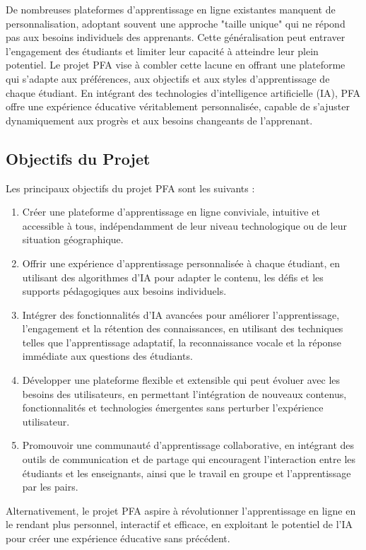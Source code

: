 De nombreuses plateformes d'apprentissage en ligne existantes manquent de personnalisation, adoptant souvent une approche "taille unique" qui ne répond pas aux besoins individuels des apprenants. Cette généralisation peut entraver l'engagement des étudiants et limiter leur capacité à atteindre leur plein potentiel. Le projet \gls{PFA} vise à combler cette lacune en offrant une plateforme qui s'adapte aux préférences, aux objectifs et aux styles d'apprentissage de chaque étudiant. En intégrant des technologies d'intelligence artificielle (\gls{IA}), \gls{PFA} offre une expérience éducative véritablement personnalisée, capable de s'ajuster dynamiquement aux progrès et aux besoins changeants de l'apprenant.

\subsection{Objectifs du Projet}

Les principaux objectifs du projet \gls{PFA} sont les suivants :

\begin{enumerate}[label=\Roman*.]

    \item Créer une plateforme d'apprentissage en ligne conviviale, intuitive et accessible à tous, indépendamment de leur niveau technologique ou de leur situation géographique.
    \item Offrir une expérience d'apprentissage personnalisée à chaque étudiant, en utilisant des algorithmes d'\gls{IA} pour adapter le contenu, les défis et les supports pédagogiques aux besoins individuels.
    \item Intégrer des fonctionnalités d'\gls{IA} avancées pour améliorer l'apprentissage, l'engagement et la rétention des connaissances, en utilisant des techniques telles que l'apprentissage adaptatif, la reconnaissance vocale et la réponse immédiate aux questions des étudiants.
    \item Développer une plateforme flexible et extensible qui peut évoluer avec les besoins des utilisateurs, en permettant l'intégration de nouveaux contenus, fonctionnalités et technologies émergentes sans perturber l'expérience utilisateur.
    \item Promouvoir une communauté d'apprentissage collaborative, en intégrant des outils de communication et de partage qui encouragent l'interaction entre les étudiants et les enseignants, ainsi que le travail en groupe et l'apprentissage par les pairs.

\end{enumerate}
Alternativement, le projet \gls{PFA} aspire à révolutionner l'apprentissage en ligne en le rendant plus personnel, interactif et efficace, en exploitant le potentiel de l'\gls{IA} pour créer une expérience éducative sans précédent.


